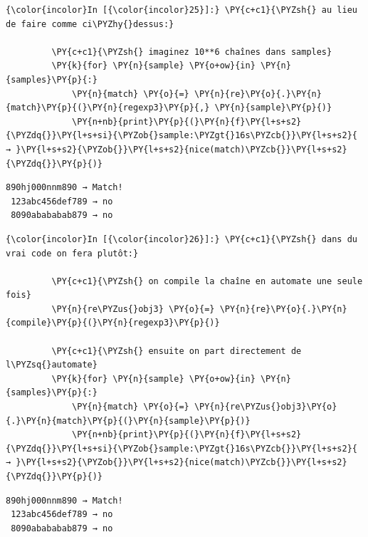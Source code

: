     \begin{Verbatim}[commandchars=\\\{\}]
{\color{incolor}In [{\color{incolor}25}]:} \PY{c+c1}{\PYZsh{} au lieu de faire comme ci\PYZhy{}dessus:}
         
         \PY{c+c1}{\PYZsh{} imaginez 10**6 chaînes dans samples}
         \PY{k}{for} \PY{n}{sample} \PY{o+ow}{in} \PY{n}{samples}\PY{p}{:}
             \PY{n}{match} \PY{o}{=} \PY{n}{re}\PY{o}{.}\PY{n}{match}\PY{p}{(}\PY{n}{regexp3}\PY{p}{,} \PY{n}{sample}\PY{p}{)}
             \PY{n+nb}{print}\PY{p}{(}\PY{n}{f}\PY{l+s+s2}{\PYZdq{}}\PY{l+s+si}{\PYZob{}sample:\PYZgt{}16s\PYZcb{}}\PY{l+s+s2}{ → }\PY{l+s+s2}{\PYZob{}}\PY{l+s+s2}{nice(match)\PYZcb{}}\PY{l+s+s2}{\PYZdq{}}\PY{p}{)}    
\end{Verbatim}


    \begin{Verbatim}[commandchars=\\\{\}]
  890hj000nnm890 → Match!
 123abc456def789 → no
 8090abababab879 → no

    \end{Verbatim}

    \begin{Verbatim}[commandchars=\\\{\}]
{\color{incolor}In [{\color{incolor}26}]:} \PY{c+c1}{\PYZsh{} dans du vrai code on fera plutôt:}
         
         \PY{c+c1}{\PYZsh{} on compile la chaîne en automate une seule fois}
         \PY{n}{re\PYZus{}obj3} \PY{o}{=} \PY{n}{re}\PY{o}{.}\PY{n}{compile}\PY{p}{(}\PY{n}{regexp3}\PY{p}{)}
         
         \PY{c+c1}{\PYZsh{} ensuite on part directement de l\PYZsq{}automate}
         \PY{k}{for} \PY{n}{sample} \PY{o+ow}{in} \PY{n}{samples}\PY{p}{:}
             \PY{n}{match} \PY{o}{=} \PY{n}{re\PYZus{}obj3}\PY{o}{.}\PY{n}{match}\PY{p}{(}\PY{n}{sample}\PY{p}{)}
             \PY{n+nb}{print}\PY{p}{(}\PY{n}{f}\PY{l+s+s2}{\PYZdq{}}\PY{l+s+si}{\PYZob{}sample:\PYZgt{}16s\PYZcb{}}\PY{l+s+s2}{ → }\PY{l+s+s2}{\PYZob{}}\PY{l+s+s2}{nice(match)\PYZcb{}}\PY{l+s+s2}{\PYZdq{}}\PY{p}{)}
\end{Verbatim}


    \begin{Verbatim}[commandchars=\\\{\}]
  890hj000nnm890 → Match!
 123abc456def789 → no
 8090abababab879 → no

    \end{Verbatim}

